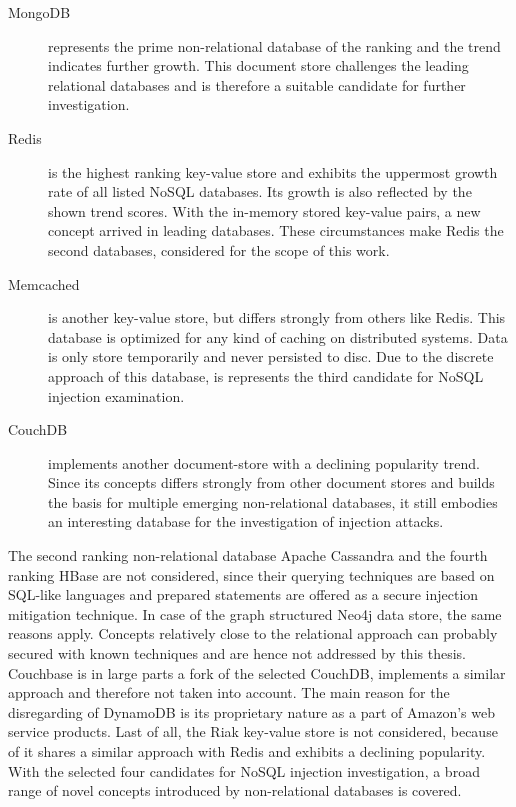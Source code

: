 \begin{description}
\item [MongoDB] represents the prime non-relational database of the ranking and the trend indicates further growth. This document store challenges the leading relational databases and is therefore a suitable candidate for further investigation. 
\item [Redis] is the highest ranking key-value store and exhibits the uppermost growth rate of all listed NoSQL databases. Its growth is also reflected by the shown trend scores. With the in-memory stored key-value pairs, a new concept arrived in leading databases. These circumstances make Redis the second databases, considered for the scope of this work.
\item [Memcached] is another key-value store, but differs strongly from others like Redis. This database is optimized for any kind of caching on distributed systems. Data is only store temporarily and never persisted to disc. Due to the discrete approach of this database, is represents the third candidate for NoSQL injection examination.
\item [CouchDB] implements another document-store with a declining popularity trend. Since its concepts differs strongly from other document stores and builds the basis for multiple emerging non-relational databases, it still embodies an interesting database for the investigation of injection attacks.
\end{description}

The second ranking non-relational database Apache Cassandra and the fourth ranking HBase are not considered, since their querying techniques are based on SQL-like languages and prepared statements are offered as a secure injection mitigation technique. In case of the graph structured Neo4j data store, the same reasons apply. Concepts relatively close to the relational approach can probably secured with known techniques and are hence not addressed by this thesis. Couchbase is in large parts a fork of the selected CouchDB, implements a similar approach and therefore not taken into account. The main reason for the disregarding of DynamoDB is its proprietary nature as a part of Amazon's web service products. Last of all, the Riak key-value store is not considered, because of it shares a similar approach with Redis and exhibits a declining popularity. With the selected four candidates for NoSQL injection investigation, a broad range of novel concepts introduced by non-relational databases is covered.

